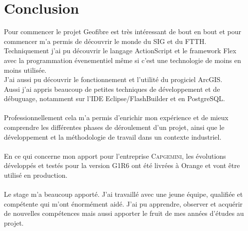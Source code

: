 \chapter*{Conclusion}

Pour commencer le projet Geofibre est très intéressant de bout en bout et pour commencer m'a permis de découvrir le monde du SIG et du FTTH.
\\Techniquement j'ai pu découvrir le langage ActionScript et le framework Flex avec la programmation évenementiel même si c'est une technologie de moins en moins utilisée.
 \\ J'ai aussi pu découvrir le fonctionnement et l'utilité du progiciel ArcGIS.
 \\Aussi j'ai appris beaucoup de petites techniques de développement et de débuguage, notamment sur l'IDE Eclipse/FlashBuilder et en PostgreSQL.
\\\\Professionnellement cela m'a permis d'enrichir mon expérience et de mieux comprendre les différentes phases de déroulement d'un projet, ainsi que le développement et la méthodologie de travail dans un contexte industriel.
\\\\En ce qui concerne mon apport pour l'entreprise \textsc{Capgemini}, les évolutions développés et testés pour la version G1R6 ont été livrées à Orange et vont être utilisé en production.
\\\\Le stage m'a beaucoup apporté. J'ai travaillé avec une jeune équipe, qualifiée et compétente qui m'ont énormément aidé. J'ai pu apprendre, observer et acquérir de nouvelles compétences mais aussi apporter le fruit de mes années d'études au projet.
